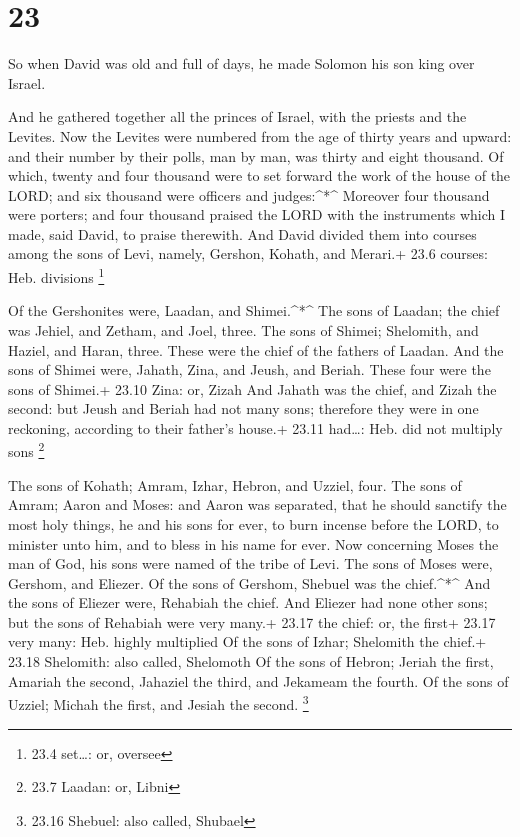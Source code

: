 \hypertarget{section-22}{%
\section{23}\label{section-22}}

 So when David was old and full of days, he made Solomon his
son king over Israel.

 And he gathered together all the princes of Israel, with
the priests and the Levites.  Now the Levites were numbered
from the age of thirty years and upward: and their number by their
polls, man by man, was thirty and eight thousand.  Of which,
twenty and four thousand were to set forward the work of the house of
the LORD; and six thousand were officers and judges:\^{}*\^{}
 Moreover four thousand were porters; and four thousand
praised the LORD with the instruments which I made, said David, to
praise therewith.  And David divided them into courses among
the sons of Levi, namely, Gershon, Kohath, and Merari.+ 23.6 courses:
Heb. divisions \footnote{23.4 set\ldots: or, oversee}

 Of the Gershonites were, Laadan, and Shimei.\^{}*\^{}
 The sons of Laadan; the chief was Jehiel, and Zetham, and
Joel, three.  The sons of Shimei; Shelomith, and Haziel, and
Haran, three. These were the chief of the fathers of Laadan.
 And the sons of Shimei were, Jahath, Zina, and Jeush, and
Beriah. These four were the sons of Shimei.+ 23.10 Zina: or, Zizah
 And Jahath was the chief, and Zizah the second: but Jeush
and Beriah had not many sons; therefore they were in one reckoning,
according to their father's house.+ 23.11 had\ldots: Heb. did not
multiply sons \footnote{23.7 Laadan: or, Libni}

 The sons of Kohath; Amram, Izhar, Hebron, and Uzziel,
four.  The sons of Amram; Aaron and Moses: and Aaron was
separated, that he should sanctify the most holy things, he and his sons
for ever, to burn incense before the LORD, to minister unto him, and to
bless in his name for ever.  Now concerning Moses the man
of God, his sons were named of the tribe of Levi.  The sons
of Moses were, Gershom, and Eliezer.  Of the sons of
Gershom, Shebuel was the chief.\^{}*\^{}  And the sons of
Eliezer were, Rehabiah the chief. And Eliezer had none other sons; but
the sons of Rehabiah were very many.+ 23.17 the chief: or, the first+
23.17 very many: Heb. highly multiplied  Of the sons of
Izhar; Shelomith the chief.+ 23.18 Shelomith: also called, Shelomoth
 Of the sons of Hebron; Jeriah the first, Amariah the
second, Jahaziel the third, and Jekameam the fourth.  Of
the sons of Uzziel; Michah the first, and Jesiah the second. \footnote{23.16
  Shebuel: also called, Shubael}


